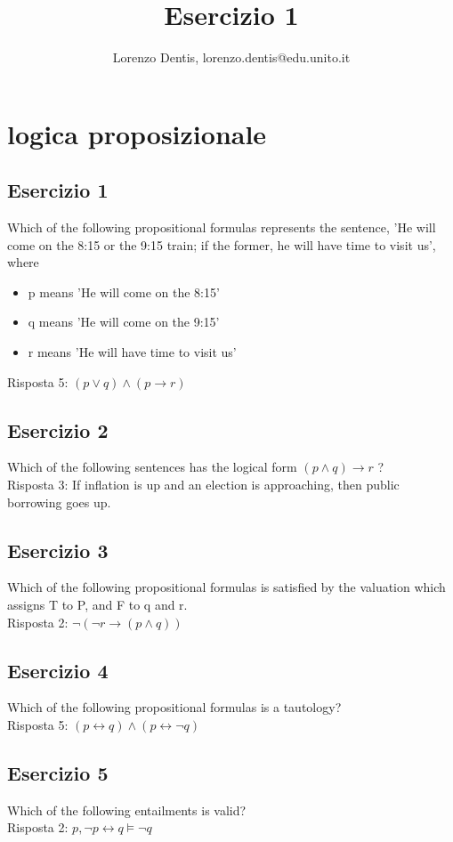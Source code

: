 \documentclass[a4paper]{article}
\begin{document}
\author{Lorenzo Dentis, lorenzo.dentis@edu.unito.it}
\title{Esercizio 1}
\maketitle

\section{logica proposizionale}
\subsection{Esercizio 1}
Which of the following propositional formulas represents the sentence, 'He will come on the 8:15 or the 9:15 train; if the former, he will have time to visit us', where
\begin{itemize}
	\item p means 'He will come on the 8:15'
	\item q means 'He will come on the 9:15'
	\item r means 'He will have time to visit us'
\end {itemize}
Risposta 5: $(p \lor  q) \land (p \rightarrow r)$
\subsection{Esercizio 2}
Which of the following sentences has the logical form $(p \land q) \rightarrow r$ ?\\
Risposta 3: If inflation is up and an election is approaching, then public borrowing goes up.
\subsection{Esercizio 3}
Which of the following propositional formulas is satisfied by the valuation which assigns T to P, and F to q and r.\\
Risposta 2: $\lnot ( \lnot r \rightarrow ( p \land q))$
\subsection{Esercizio 4}
Which of the following propositional formulas is a tautology?\\
Risposta 5: $ (p \leftrightarrow q) \land (p \leftrightarrow \lnot q)$
\subsection{Esercizio 5}
Which of the following entailments is valid?\\
Risposta 2: $ p, \lnot p \leftrightarrow q \models \lnot q $
\end{document}
